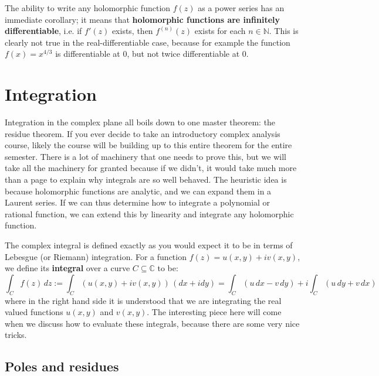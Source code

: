\documentclass[11pt, oneside]{article}   	%
\theoremstyle{definition}
\begin{document}
The ability to write any holomorphic function $f(z)$ as a power series has an immediate corollary; it means that 
\textbf{holomorphic functions are infinitely differentiable}, i.e. if $f'(z)$ exists, then $f^{(n)}(z)$ exists for each $n\in\mathbb N$. 
This is clearly not true in the real-differentiable case, because for example the function $f(x) = x^{4/3}$ is differentiable at 
$0$, but not twice differentiable at $0$. 


\section{Integration}

Integration in the complex plane all boils down to one master theorem: the residue theorem. If you ever decide to take an 
introductory complex analysis course, likely the course will be building up to this entire theorem for the entire semester. 
There is a lot of machinery that one needs to prove this, but we will take all the machinery for granted because if we didn't, 
it would take much more than a page to explain why integrals are so well behaved. The heuristic idea is because holomorphic 
functions are analytic, and we can expand them in a Laurent series. If we can thus determine how to integrate a polynomial 
or rational function, we can extend this by linearity and integrate any holomorphic function. 

The complex integral is defined exactly as you would expect it to be in terms of Lebesgue (or Riemann) integration. For 
a function $f(z) = u(x, y) + iv(x, y)$, we define its \textbf{integral} over a curve $C\subseteq \mathbb C$ to be:
\begin{equation}
	\int_C f(z)\,dz := \int_C (u(x, y) + iv(x, y))\,(dx + i dy) = \int_C (u\, dx - v\,dy) + i\int_C (u\,dy + v\,dx)
\end{equation}
where in the right hand side it is understood that we are integrating the real valued functions $u(x, y)$ and $v(x, y)$. 
The interesting piece here will come when we discuss how to evaluate these integrals, because there are some very 
nice tricks. 

\subsection{Poles and residues}
\end{document}
